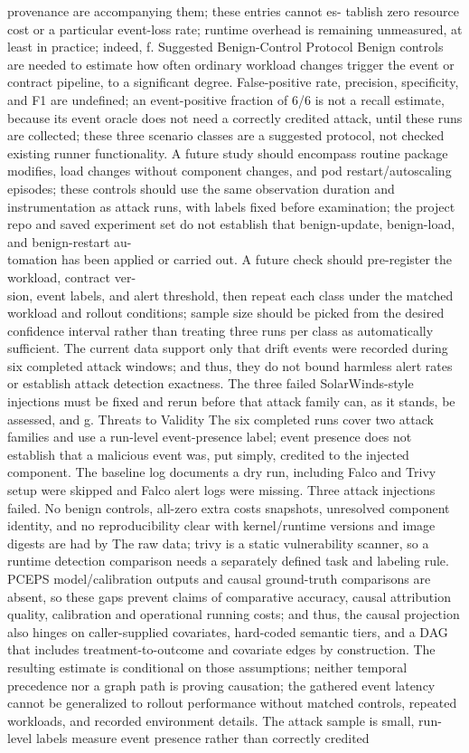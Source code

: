 \documentclass[conference]{IEEEtran}
\begin{document}
provenance are accompanying them; these entries cannot es- tablish zero resource cost or a particular event-loss rate; runtime overhead is remaining unmeasured, at least in practice; indeed, f. Suggested Benign-Control Protocol Benign controls are needed to estimate how often ordinary workload changes trigger the event or contract pipeline, to a significant degree. False-positive rate, precision, specificity, and F1 are undefined; an event-positive fraction of 6/6 is not a recall estimate, because its event oracle does not need a correctly credited attack, until these runs are collected; these three scenario classes are a suggested protocol, not checked existing runner functionality. A future study should encompass routine package modifies, load changes without component changes, and pod restart/autoscaling episodes; these controls should use the same observation duration and instrumentation as attack runs, with labels fixed before examination; the project repo and saved experiment set do not establish that benign-update, benign-load, and benign-restart au-\\tomation has been applied or carried out. A future check should pre-register the workload, contract ver-\\sion, event labels, and alert threshold, then repeat each class under the matched workload and rollout conditions; sample size should be picked from the desired confidence interval rather than treating three runs per class as automatically suﬀicient. The current data support only that drift events were recorded during six completed attack windows; and thus, they do not bound harmless alert rates or establish attack detection exactness. The three failed SolarWinds-style injections must be fixed and rerun before that attack family can, as it stands, be assessed, and g. Threats to Validity The six completed runs cover two attack families and use a run-level event-presence label; event presence does not establish that a malicious event was, put simply, credited to the injected component. The baseline log documents a dry run, including Falco and Trivy setup were skipped and Falco alert logs were missing. Three attack injections failed. No benign controls, all-zero extra costs snapshots, unresolved component identity, and no reproducibility clear with kernel/runtime versions and image digests are had by The raw data; trivy is a static vulnerability scanner, so a runtime detection comparison needs a separately defined task and labeling rule. PCEPS model/calibration outputs and causal ground-truth comparisons are absent, so these gaps prevent claims of comparative accuracy, causal attribution quality, calibration and operational running costs; and thus, the causal projection also hinges on caller-supplied covariates, hard-coded semantic tiers, and a DAG that includes treatment-to-outcome and covariate edges by construction. The resulting estimate is conditional on those assumptions; neither temporal precedence nor a graph path is proving causation; the gathered event latency cannot be generalized to rollout performance without matched controls, repeated workloads, and recorded environment details. The attack sample is small, run-level labels measure event presence rather than correctly credited 
\end{document}
